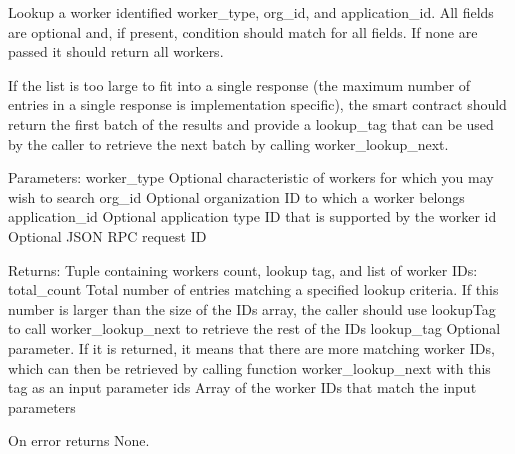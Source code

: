 \begin{DoxyVerb}Lookup a worker identified worker_type, org_id, and application_id.
All fields are optional and, if present, condition should match for
all fields. If none are passed it should return all workers.

If the list is too large to fit into a single response (the maximum
number of entries in a single response is implementation specific),
the smart contract should return the first batch of the results
and provide a lookup_tag that can be used by the caller to
retrieve the next batch by calling worker_lookup_next.

Parameters:
worker_type         Optional characteristic of workers for which
            you may wish to search
org_id              Optional organization ID to which a worker belongs
application_id      Optional application type ID that is
            supported by the worker
id                  Optional JSON RPC request ID

Returns:
Tuple containing workers count, lookup tag, and list of
worker IDs:
total_count Total number of entries matching a specified
    lookup criteria. If this number is larger than the
    size of the IDs array, the caller should use
    lookupTag to call worker_lookup_next to retrieve
    the rest of the IDs
lookup_tag  Optional parameter. If it is returned, it means
    that there are more matching worker IDs, which can then
    be retrieved by calling function worker_lookup_next
    with this tag as an input parameter
ids         Array of the worker IDs that match the input parameters

On error returns None.
\end{DoxyVerb}
 \mbox{\label{classavalon__sdk_1_1connector_1_1blockchains_1_1fabric_1_1fabric__worker__registry_1_1FabricWorkerRegistryImpl_a82429da0b926f4cc6d2ad2fb8a99e149}} 
